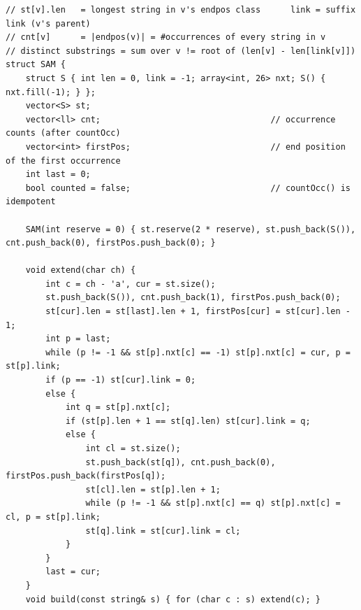 \documentclass[9pt,a4paper,twocolumn]{extarticle}
\begin{document}
\begin{lstlisting}
// st[v].len   = longest string in v's endpos class      link = suffix link (v's parent)
// cnt[v]      = |endpos(v)| = #occurrences of every string in v
// distinct substrings = sum over v != root of (len[v] - len[link[v]])
struct SAM {
    struct S { int len = 0, link = -1; array<int, 26> nxt; S() { nxt.fill(-1); } };
    vector<S> st;
    vector<ll> cnt;                                  // occurrence counts (after countOcc)
    vector<int> firstPos;                            // end position of the first occurrence
    int last = 0;
    bool counted = false;                            // countOcc() is idempotent

    SAM(int reserve = 0) { st.reserve(2 * reserve), st.push_back(S()), cnt.push_back(0), firstPos.push_back(0); }

    void extend(char ch) {
        int c = ch - 'a', cur = st.size();
        st.push_back(S()), cnt.push_back(1), firstPos.push_back(0);
        st[cur].len = st[last].len + 1, firstPos[cur] = st[cur].len - 1;
        int p = last;
        while (p != -1 && st[p].nxt[c] == -1) st[p].nxt[c] = cur, p = st[p].link;
        if (p == -1) st[cur].link = 0;
        else {
            int q = st[p].nxt[c];
            if (st[p].len + 1 == st[q].len) st[cur].link = q;
            else {
                int cl = st.size();
                st.push_back(st[q]), cnt.push_back(0), firstPos.push_back(firstPos[q]);
                st[cl].len = st[p].len + 1;
                while (p != -1 && st[p].nxt[c] == q) st[p].nxt[c] = cl, p = st[p].link;
                st[q].link = st[cur].link = cl;
            }
        }
        last = cur;
    }
    void build(const string& s) { for (char c : s) extend(c); }


\end{lstlisting}
\end{document}
